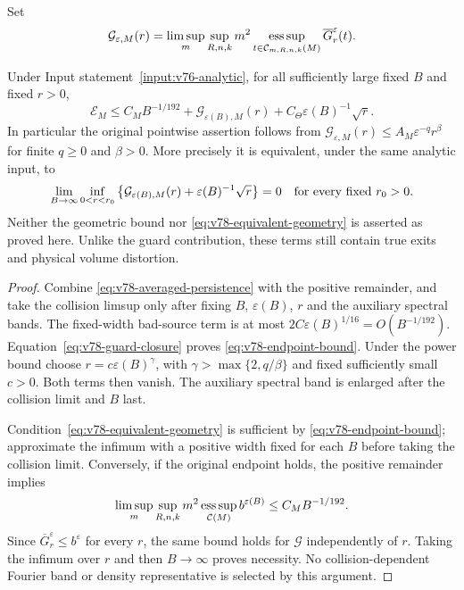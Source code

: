 Set
\begin{equation}\label{eq:v78-ordered-geometry}
 \mathcal G_{\varepsilon,M}(r)=
   \limsup_m\sup_{R,n,k}m^2
   \esssup_{t\in\mathcal C_{m,R,n,k}(M)}
                      \overline G_r^\varepsilon(t).
\end{equation}
\begin{theorem}
\label{thm:v78-endpoint}
Under Input statement~\ref{input:v76-analytic}, for all sufficiently
large fixed $B$ and fixed $r>0$,
\begin{equation}\label{eq:v78-endpoint-bound}
 \mathcal E_M\le C_MB^{-1/192}
       +\mathcal G_{\varepsilon(B),M}(r)
       +C_\Theta\varepsilon(B)^{-1}\sqrt r.
\end{equation}
In particular the original pointwise assertion follows from
$\mathcal G_{\varepsilon,M}(r)\le A_M\varepsilon^{-q}r^\beta$
for finite $q\ge0$ and $\beta>0$. More precisely it is equivalent,
under the same analytic input, to
\begin{equation}\label{eq:v78-equivalent-geometry}
 \lim_{B\to\infty}\inf_{0<r<r_0}
   \left\{\mathcal G_{\varepsilon(B),M}(r)
                +\varepsilon(B)^{-1}\sqrt r\right\}=0
 \quad\hbox{for every fixed }r_0>0.
\end{equation}
Neither the geometric bound nor \eqref{eq:v78-equivalent-geometry}
is asserted as proved here. Unlike the guard contribution, these
terms still contain true exits and physical volume distortion.
\end{theorem}
\begin{proof}
Combine \eqref{eq:v78-averaged-persistence} with the positive
remainder, and take the collision limsup only after fixing
$B$, $\varepsilon(B)$, $r$ and the auxiliary spectral bands.
The fixed-width bad-source term is at most
$2C\varepsilon(B)^{1/16}=O(B^{-1/192})$.
Equation~\eqref{eq:v78-guard-closure} proves
\eqref{eq:v78-endpoint-bound}. Under the power bound choose
$r=c\varepsilon(B)^\gamma$, with
$\gamma>\max\{2,q/\beta\}$ and fixed sufficiently small $c>0$.
Both terms then vanish. The auxiliary spectral band is enlarged
after the collision limit and $B$ last.

Condition~\eqref{eq:v78-equivalent-geometry} is sufficient by
\eqref{eq:v78-endpoint-bound}; approximate the infimum with a
positive width fixed for each $B$ before taking the collision limit.
Conversely, if the original endpoint holds, the positive remainder
implies
\[
 \limsup_m\sup_{R,n,k}m^2
       \operatorname*{ess\,sup}_{\mathcal C(M)}b^{\varepsilon(B)}
                         \le C_MB^{-1/192}.
\]
Since $\overline G_r^\varepsilon\le b^\varepsilon$ for every $r$,
the same bound holds for $\mathcal G$ independently of $r$.
Taking the infimum over $r$ and then $B\to\infty$ proves necessity.
No collision-dependent Fourier band or density representative is
selected by this argument.
\end{proof}

